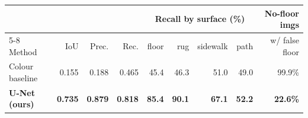 \begin{tabular}{lrrrrrrrr}
\toprule
& & & & \multicolumn{4}{c}{Recall by surface (\%)} & No-floor imgs \\ \cmidrule(lr){5-8}
Method & IoU & Prec. & Rec. & floor & rug & sidewalk & path & w/ false floor \\
\midrule
Colour baseline & 0.155 & 0.188 & 0.465 & 45.4 & 46.3 & 51.0 & 49.0 & 99.9\% \\
\textbf{U-Net (ours)} & \textbf{0.735} & \textbf{0.879} & \textbf{0.818} & \textbf{85.4} & \textbf{90.1} & \textbf{67.1} & \textbf{52.2} & \textbf{22.6\%} \\
\bottomrule
\end{tabular}
